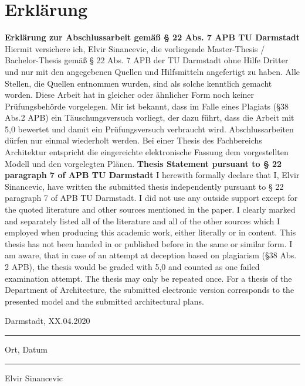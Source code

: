 \chapter*{Erklärung}\label{cha:Erklärung}
\textbf{Erklärung zur Abschlussarbeit gemäß § 22 Abs. 7 APB TU Darmstadt}
\newline\newline
Hiermit versichere ich, Elvir Sinancevic, die vorliegende Master-Thesis / Bachelor-Thesis gemäß § 22 Abs. 7 APB der TU Darmstadt ohne Hilfe Dritter und nur mit den angegebenen Quellen und Hilfsmitteln angefertigt zu haben. Alle Stellen, die Quellen entnommen wurden, sind als solche kenntlich gemacht worden. Diese Arbeit hat in gleicher oder ähnlicher Form noch keiner Prüfungsbehörde vorgelegen. 
\newline\newline
Mir ist bekannt, dass im Falle eines Plagiats (§38 Abs.2 APB) ein Täuschungsversuch vorliegt, der dazu führt, dass die Arbeit mit 5,0 bewertet und damit ein Prüfungsversuch verbraucht wird. Abschlussarbeiten dürfen nur einmal wiederholt werden.
\newline\newline
Bei einer Thesis des Fachbereichs Architektur entspricht die eingereichte elektronische Fassung dem vorgestellten Modell und den vorgelegten Plänen.
\newline\newline
\newline\newline
\textbf{Thesis Statement pursuant to § 22 paragraph 7 of APB TU Darmstadt}
\newline\newline
I herewith formally declare that I, Elvir Sinancevic, have written the submitted thesis independently pursuant to § 22 paragraph 7 of APB TU Darmstadt. I did not use any outside support except for the quoted literature and other sources mentioned in the paper. I clearly marked and separately listed all of the literature and all of the other sources which I employed when producing this academic work, either literally or in content. This thesis has not been handed in or published before in the same or similar form.
\newline\newline
I am aware, that in case of an attempt at deception based on plagiarism (§38 Abs. 2 APB), the thesis would be graded with 5,0 and counted as one failed examination attempt. The thesis may only be repeated once.
\newline\newline
For a thesis of the Department of Architecture, the submitted electronic version corresponds to the presented model and the submitted architectural plans.
\newline\newline
\newline\newline
\parbox{5cm}{\centering Darmstadt, XX.04.2020\hrule
	\strut \centering\footnotesize Ort, Datum} \hfill\parbox{5cm}{\hrule
	\strut \centering\footnotesize Elvir Sinancevic}